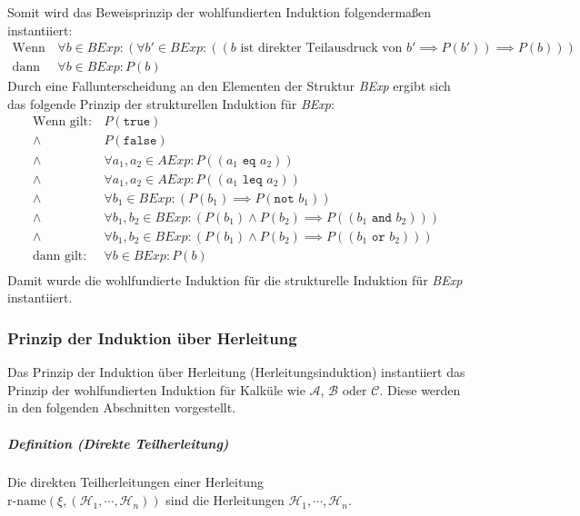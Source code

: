 \documentclass[a4paper, 11pt, accentcolor = tud3b]{tudreport}
\newcommand{\definition}[2]{\subparagraph{Definition (#1)} #2}
\begin{document}
					    Somit wird das Beweisprinzip der wohlfundierten Induktion folgendermaßen instantiiert:
					    \begin{align*}
						    \text{Wenn gilt:} & \,\forall b \in \textit{BExp} : (\forall b' \in \textit{BExp} : ((b \text{ ist direkter Teilausdruck von } b' \implies P(b')) \implies P(b))) \\
							\text{dann gilt:} & \,\forall b \in \textit{BExp} : P(b)
					    \end{align*}
					    Durch eine Fallunterscheidung an den Elementen der Struktur \textit{BExp} ergibt sich das folgende Prinzip der strukturellen Induktion für \textit{BExp}:
					    \begin{align*}
						    \text{Wenn gilt:} & \,P(\texttt{true}) \\
						    \land & \,P(\texttt{false}) \\
						    \land & \,\forall a _ 1, a _ 2 \in \textit{AExp} : P((a _ 1 \texttt{ eq } a _ 2)) \\
						    \land & \,\forall a _ 1, a _ 2 \in \textit{AExp} : P((a _ 1 \texttt{ leq } a _ 2)) \\
							\land & \,\forall b _ 1 \in \textit{BExp} : (P(b _ 1) \implies P(\texttt{not } b _ 1)) \\
						    \land & \,\forall b _ 1, b _ 2 \in \textit{BExp} : (P(b _ 1) \land P(b _ 2) \implies P((b _ 1 \texttt{ and } b _ 2))) \\
						    \land & \,\forall b _ 1, b _ 2 \in \textit{BExp} : (P(b _ 1) \land P(b _ 2) \implies P((b _ 1 \texttt{ or } b _ 2))) \\
						    \text{dann gilt:} & \,\forall b \in \textit{BExp} : P(b) \\
					    \end{align*}
					    Damit wurde die wohlfundierte Induktion für die strukturelle Induktion für \textit{BExp} instantiiert.
			    
			    \subsubsection{Prinzip der Induktion über Herleitung}
				    Das Prinzip der Induktion über Herleitung (Herleitungsinduktion) instantiiert das Prinzip der wohlfundierten Induktion für Kalküle wie $ \mathcal{A} $, $ \mathcal{B} $ oder $ \mathcal{C} $. Diese werden in den folgenden Abschnitten vorgestellt.
			    
				    \definition{Direkte Teilherleitung}{Die direkten Teilherleitungen einer Herleitung \\ $ \text{r-name}(\xi, (\mathcal{H} _ 1, \cdots, \mathcal{H} _ n)) $ sind die Herleitungen $ \mathcal{H} _ 1, \cdots, \mathcal{H} _ n $.}
				    
\end{document}
